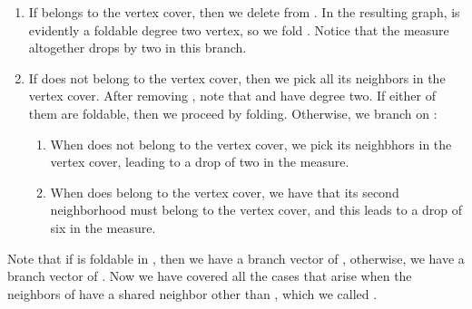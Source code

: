 \documentclass[svgnames]{llncs}
\newcommand{\branchvector}[1]{{\color{IndianRed}{}}}
\begin{document}
{\begin{enumerate}
\item If  belongs to the vertex cover, then we delete  from . In the resulting graph,  is evidently a foldable degree two vertex, so we fold . Notice that the measure altogether drops by two in this branch.
\item If  does not belong to the vertex cover, then we pick all its neighbors in the vertex cover. After removing , note that  and  have degree two. If either of them are foldable, then we proceed by folding. Otherwise, we branch on :
\begin{enumerate}
\item When  does not belong to the vertex cover, we pick its neighbhors in the vertex cover, leading to a drop of two in the measure.
\item When  does belong to the vertex cover, we have that its second neighborhood must belong to the vertex cover, and this leads to a drop of six in the measure.
\end{enumerate}
\end{enumerate}

Note that if  is foldable in , then we have a branch vector of \branchvector{2,5}, otherwise, we have a branch vector of \branchvector{2,6,10}. Now we have covered all the cases that arise when the neighbors of  have a shared neighbor other than , which we called .



\begin{figure}[ht]
\centering
\begin{minipage}[c]{0.45\linewidth}
\end{minipage}
\end{figure}}
\end{document}
